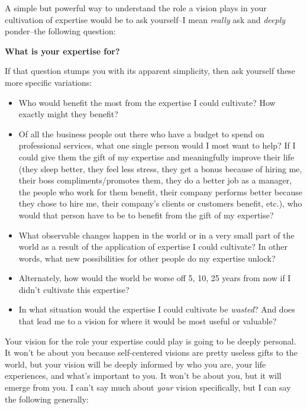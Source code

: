 A simple but powerful way to understand the role a vision plays in your cultivation of expertise would be to ask yourself--I mean \emph{really} ask and \emph{deeply} ponder--the following question:

\textbf{What is your expertise for?}

If that question stumps you with its apparent simplicity, then ask yourself these more specific variations:

\begin{itemize}
\item Who would benefit the most from the expertise I could cultivate? How exactly might they benefit?
\item Of all the business people out there who have a budget to spend on professional services, what one single person would I most want to help? If I could give them the gift of my expertise and meaningfully improve their life (they sleep better, they feel less stress, they get a bonus because of hiring me, their boss compliments/promotes them, they do a better job as a manager, the people who work for them benefit, their company performs better because they chose to hire me, their company's clients or customers benefit, etc.), who would that person have to be to benefit from the gift of my expertise?
\item What observable changes happen in the world or in a very small part of the world as a result of the application of expertise I could cultivate? In other words, what new possibilities for other people do my expertise unlock?
\item Alternately, how would the world be worse off 5, 10, 25 years from now if I didn't cultivate this expertise?
\item In what situation would the expertise I could cultivate be \emph{wasted}? And does that lead me to a vision for where it would be most useful or valuable?
\end{itemize}

Your vision for the role your expertise could play is going to be deeply personal. It won't be about you because self-centered visions are pretty useless gifts to the world, but your vision will be deeply informed by who you are, your life experiences, and what's important to you. It won't be about you, but it will emerge from you. I can't say much about \emph{your} vision specifically, but I can say the following generally:


